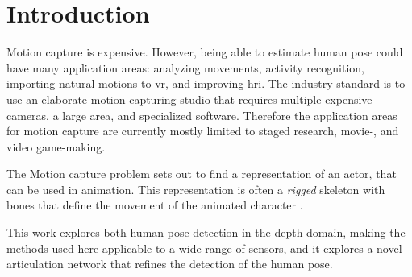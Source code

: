 \chapter{Introduction}





Motion capture is expensive. However, being able to estimate human pose could have many application areas: analyzing movements, activity recognition, importing natural motions to \gls{vr}, and improving \gls{hri}. The industry standard is to use an elaborate motion-capturing studio that requires multiple expensive cameras, a large area, and specialized software. Therefore the application areas for motion capture are currently mostly limited to staged research, movie-, and video game-making. 

The Motion capture problem sets out to find a representation of an actor, that can be used in animation. This representation is often a \emph{rigged} skeleton with bones that define the movement of the animated character \cite{skeletonAnimation}.

This work explores both human pose detection in the depth domain, making the methods used here applicable to a wide range of sensors, and it explores a novel articulation network that refines the detection of the human pose.



